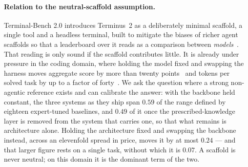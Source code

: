 \paragraph{Relation to the neutral-scaffold assumption.}
Terminal-Bench 2.0 introduces Terminus~2 as a deliberately minimal scaffold, a
single tool and a headless terminal, built to mitigate the biases of richer agent
scaffolds so that a leaderboard over it reads as a comparison between
\emph{models}~\citep{merrill2026terminalbench}. That reading is only sound if
the scaffold contributes little. It is already under pressure in the coding
domain, where holding the model fixed and swapping the harness moves aggregate
score by more than twenty points~\citep{harnessbench2026} and tokens per solved
task by up to a factor of forty~\citep{scaffoldeffect2026}. We ask the question
where a strong non-agentic reference exists and can calibrate the answer: with
the backbone held constant, the three systems as they ship span $0.59$ of the
range defined by eighteen expert-tuned baselines, and $0.49$ of it once the
prescribed-knowledge layer is removed from the system that carries one, so that
what remains is architecture alone. Holding the architecture fixed and swapping
the backbone instead, across an elevenfold spread in price, moves it by at most
$0.24$ --- and that larger figure rests
on a single task, without which it is $0.07$. A scaffold is never neutral; on this domain it is the dominant
term of the two.
